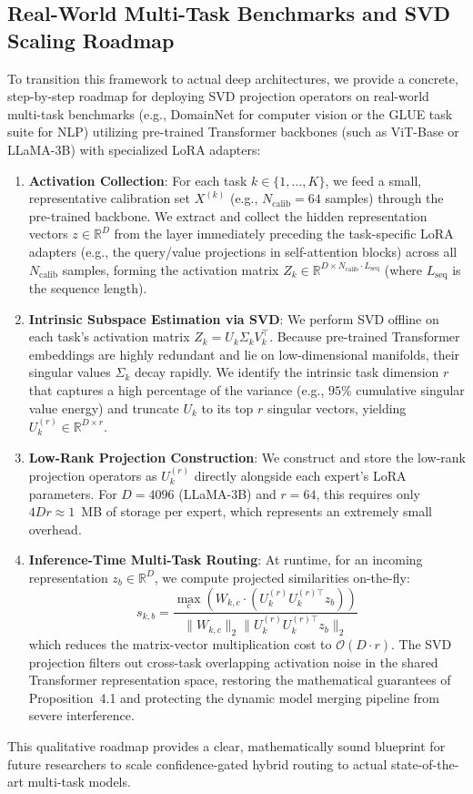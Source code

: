 \documentclass{article}
\theoremstyle{plain}
\theoremstyle{definition}
\theoremstyle{remark}
\begin{document}
\subsection{Real-World Multi-Task Benchmarks and SVD Scaling Roadmap}
To transition this framework to actual deep architectures, we provide a concrete, step-by-step roadmap for deploying SVD projection operators on real-world multi-task benchmarks (e.g., DomainNet for computer vision or the GLUE task suite for NLP) utilizing pre-trained Transformer backbones (such as ViT-Base or LLaMA-3B) with specialized LoRA adapters:
\begin{enumerate}
    \item \textbf{Activation Collection}: For each task $k \in \{1, \dots, K\}$, we feed a small, representative calibration set $X^{(k)}$ (e.g., $N_{\text{calib}} = 64$ samples) through the pre-trained backbone. We extract and collect the hidden representation vectors $z \in \mathbb{R}^D$ from the layer immediately preceding the task-specific LoRA adapters (e.g., the query/value projections in self-attention blocks) across all $N_{\text{calib}}$ samples, forming the activation matrix $Z_k \in \mathbb{R}^{D \times N_{\text{calib}} \cdot L_{\text{seq}}}$ (where $L_{\text{seq}}$ is the sequence length).
    \item \textbf{Intrinsic Subspace Estimation via SVD}: We perform SVD offline on each task's activation matrix $Z_k = U_k \Sigma_k V_k^\top$. Because pre-trained Transformer embeddings are highly redundant and lie on low-dimensional manifolds, their singular values $\Sigma_k$ decay rapidly. We identify the intrinsic task dimension $r$ that captures a high percentage of the variance (e.g., $95\%$ cumulative singular value energy) and truncate $U_k$ to its top $r$ singular vectors, yielding $U_k^{(r)} \in \mathbb{R}^{D \times r}$.
    \item \textbf{Low-Rank Projection Construction}: We construct and store the low-rank projection operators as $U_k^{(r)}$ directly alongside each expert's LoRA parameters. For $D = 4096$ (LLaMA-3B) and $r = 64$, this requires only $4 D r \approx 1$~MB of storage per expert, which represents an extremely small overhead.
    \item \textbf{Inference-Time Multi-Task Routing}: At runtime, for an incoming representation $z_b \in \mathbb{R}^D$, we compute projected similarities on-the-fly:
    \begin{equation}
    s_{k, b} = \frac{\max_c (W_{k, c} \cdot (U_k^{(r)} U_k^{(r)\top} z_b))}{\|W_{k, c}\|_2 \|U_k^{(r)} U_k^{(r)\top} z_b\|_2}
    \end{equation}
    which reduces the matrix-vector multiplication cost to $\mathcal{O}(D \cdot r)$. The SVD projection filters out cross-task overlapping activation noise in the shared Transformer representation space, restoring the mathematical guarantees of Proposition~4.1 and protecting the dynamic model merging pipeline from severe interference.
\end{enumerate}
This qualitative roadmap provides a clear, mathematically sound blueprint for future researchers to scale confidence-gated hybrid routing to actual state-of-the-art multi-task models.
\end{document}
